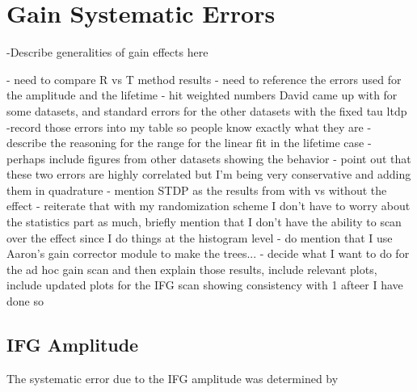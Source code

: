 
\graphicspath{{Body/Figures/Gain/IFG/60h/Amplitude/}{Body/Figures/Gain/IFG/60h/Amplitude-With-AdHoc/}{Body/Figures/Gain/IFG/60h/Lifetime/}{Body/Figures/Gain/IFG/9d/Lifetime/}}

\section{Gain Systematic Errors}



\cite{GainElog}



-Describe generalities of gain effects here



- need to compare R vs T method results
- need to reference the errors used for the amplitude and the lifetime - hit weighted numbers David came up with for some datasets, and standard errors for the other datasets with the fixed tau ltdp
-record those errors into my table so people know exactly what they are
- describe the reasoning for the range for the linear fit in the lifetime case - perhaps include figures from other datasets showing the behavior
- point out that these two errors are highly correlated but I'm being very conservative and adding them in quadrature
- mention STDP as the results from with vs without the effect - reiterate that with my randomization scheme I don't have to worry about the statistics part as much, briefly mention that I don't have the ability to scan over the effect since I do things at the histogram level - do mention that I use Aaron's gain corrector module to make the trees...
- decide what I want to do for the ad hoc gain scan and then explain those results, include relevant plots, include updated plots for the IFG scan showing consistency with 1 afteer I have done so





\subsection{IFG Amplitude}


The systematic error due to the IFG amplitude was determined by 




